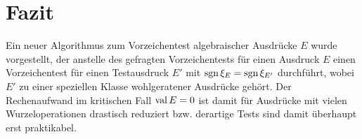 %
%
\vfill\vfill\vfill\vfill\vfill
\section{Fazit}

Ein neuer Algorithmus zum Vorzeichentest 
algebraischer Ausdrücke $E$ wurde vorgestellt,
der anstelle des gefragten Vorzeichentests
für einen Ausdruck $E$ einen Vorzeichentest
für einen Testausdruck $E'$ mit $\operatorname{sgn}\xi_E=\operatorname{sgn}\xi_{E'}$
durchführt, wobei $E'$ zu einer speziellen Klasse
wohlgeratener Ausdrücke gehört.
Der Rechenaufwand im kritischen Fall $\mathop{\rm val}\nolimits E=0$ ist damit
für Ausdrücke mit vielen Wurzeloperationen 
drastisch reduziert 
bzw. derartige Tests sind damit überhaupt erst praktikabel.


%
%

